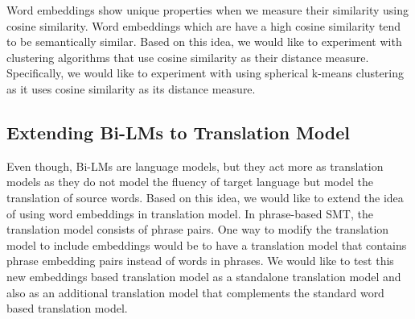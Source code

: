 Word embeddings show unique properties when we measure their similarity using cosine similarity. Word embeddings which are have a high cosine similarity tend to be semantically similar. Based on this idea, we would like to experiment with clustering algorithms that use cosine similarity as their distance measure. Specifically, we would like to experiment with using spherical k-means clustering~\cite{Hornik2012} as it uses cosine similarity as its distance measure.

\subsection{Extending Bi-LMs to Translation Model}
Even though, Bi-LMs are language models, but they act more as translation models as they do not model the fluency of target language but model the translation of source words. Based on this idea, we would like to extend the idea of using word embeddings in translation model. In phrase-based SMT, the translation model consists of phrase pairs. One way to modify the translation model to include embeddings would be to have a translation model that contains phrase embedding pairs instead of words in phrases. We would like to test this new embeddings based translation model as a standalone translation model and also as an additional translation model that complements the standard word based translation model.